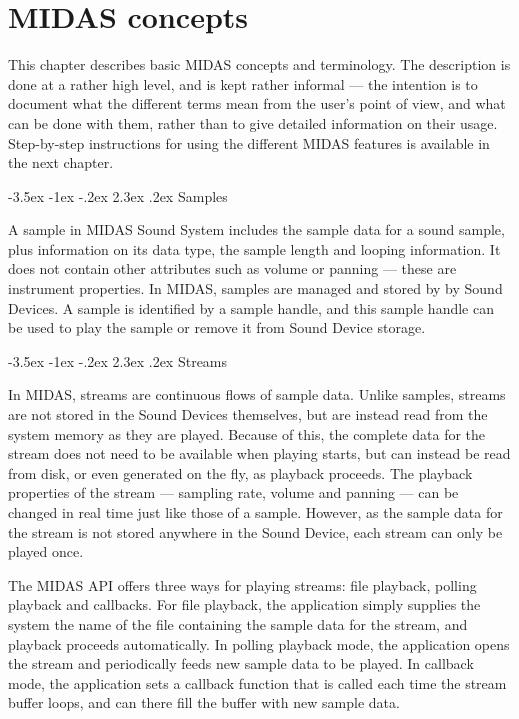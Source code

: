 \documentclass[a4paper,12pt,oneside]{book}
\makeatletter
\renewcommand\section{\@startsection {section}{1}{-20pt}%
                                   {-3.5ex \@plus -1ex \@minus -.2ex}%
                                   {2.3ex \@plus.2ex}%
                                   {\normalfont\Large\bfseries}}
\makeatother
\begin{document}
\chapter{MIDAS concepts}

This chapter describes basic MIDAS concepts and terminology. The description
is done at a rather high level, and is kept rather informal --- the intention
is to document what the different terms mean from the user's point of view,
and what can be done with them, rather than to give detailed information on
their usage. Step-by-step instructions for using the different MIDAS features
is available in the next chapter.


\section{Samples}

A sample in MIDAS Sound System includes the sample data for a sound sample,
plus information on its data type, the sample length and looping information.
It does not contain other attributes such as volume or panning --- these are
instrument properties. In MIDAS, samples are managed and stored by by Sound
Devices. A sample is identified by a sample handle, and this sample handle
can be used to play the sample or remove it from Sound Device storage.


\section{Streams}

In MIDAS, streams are continuous flows of sample data. Unlike samples,
streams are not stored in the Sound Devices themselves, but are instead read
from the system memory as they are played. Because of this, the complete data
for the stream does not need to be available when playing starts, but can
instead be read from disk, or even generated on the fly, as playback
proceeds. The playback properties of the stream --- sampling rate, volume and
panning --- can be changed in real time just like those of a sample. However,
as the sample data for the stream is not stored anywhere in the Sound Device,
each stream can only be played once.

The MIDAS API offers three ways for playing streams: file playback, polling
playback and callbacks. For file playback, the application simply supplies
the system the name of the file containing the sample data for the stream,
and playback proceeds automatically. In polling playback mode, the
application opens the stream and periodically feeds new sample data to be
played. In callback mode, the application sets a callback function that is
called each time the stream buffer loops, and can there fill the buffer with
new sample data.
\end{document}
